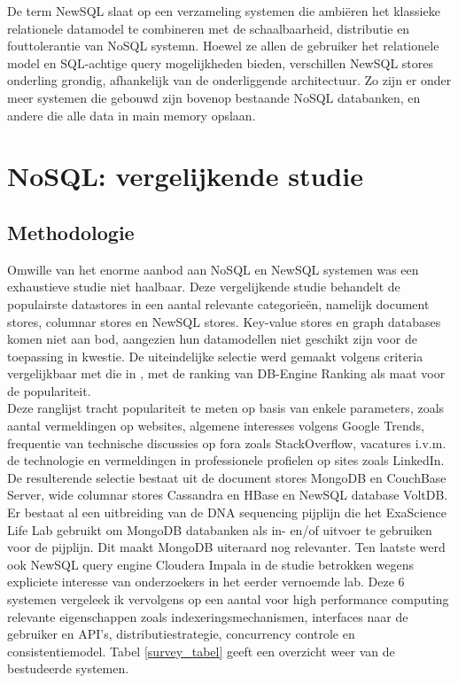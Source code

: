 De term NewSQL slaat op een verzameling systemen die ambi\"eren het klassieke relationele datamodel te combineren met de schaalbaarheid, distributie en fouttolerantie van NoSQL systemn. Hoewel ze allen de gebruiker het relationele model en SQL-achtige query mogelijkheden bieden, verschillen NewSQL stores onderling grondig, afhankelijk van de onderliggende architectuur. Zo zijn er onder meer systemen die gebouwd zijn bovenop bestaande NoSQL databanken, en andere die alle data in main memory opslaan.\cite{grolinger2013data}

\section{NoSQL: vergelijkende studie}
\label{nosql_survey}

\subsection{Methodologie}

Omwille van het enorme aanbod aan NoSQL en NewSQL systemen was een exhaustieve studie niet haalbaar. Deze vergelijkende studie behandelt de populairste datastores in een aantal relevante categorie\"en, namelijk document stores, columnar stores en NewSQL stores. Key-value stores en graph databases komen niet aan bod, aangezien hun datamodellen niet geschikt zijn voor de toepassing in kwestie. De uiteindelijke selectie werd gemaakt volgens criteria vergelijkbaar met die in \cite{grolinger2013data}, met de ranking van DB-Engine Ranking \cite{db_engine_rank} als maat voor de populariteit.\\

Deze ranglijst tracht populariteit te meten op basis van enkele parameters, zoals aantal vermeldingen op websites, algemene interesses volgens Google Trends, frequentie van technische discussies op fora zoals StackOverflow, vacatures i.v.m. de technologie en vermeldingen in professionele profielen op sites zoals LinkedIn. De resulterende selectie bestaat uit de document stores MongoDB en CouchBase Server, wide columnar stores Cassandra en HBase en NewSQL database VoltDB. Er bestaat al een uitbreiding van de DNA sequencing pijplijn die het ExaScience Life Lab gebruikt om MongoDB  databanken als in- en/of uitvoer te gebruiken voor de pijplijn. Dit maakt MongoDB uiteraard nog relevanter. Ten laatste werd ook NewSQL query engine Cloudera Impala in de studie betrokken wegens expliciete interesse van onderzoekers in het eerder vernoemde lab. Deze 6 systemen vergeleek ik 
vervolgens op een aantal voor high performance computing relevante eigenschappen zoals indexeringsmechanismen, interfaces naar de gebruiker en API's, distributiestrategie, concurrency controle en consistentiemodel. Tabel \ref{survey_tabel} geeft een overzicht weer van de bestudeerde systemen.


